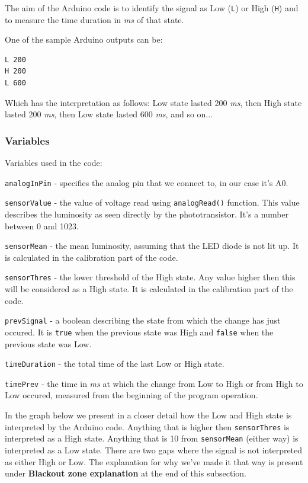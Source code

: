 \documentclass[12pt]{report}
\begin{document}
The aim of the Arduino code is to identify the signal as Low (\verb|L|) or High (\verb|H|) and to measure the time duration in \textit{ms} of that state.

One of the sample Arduino outputs can be:

\begin{snugshade}
\begin{verbatim}
L 200
H 200
L 600
\end{verbatim}
\end{snugshade}

Which has the interpretation as follows: Low state lasted 200 \textit{ms}, then High state lasted 200 \textit{ms}, then Low state lasted 600 \textit{ms}, and so on...




\subsubsection{Variables}

Variables used in the code:

\verb|analogInPin| - specifies the analog pin that we connect to, in our case it's A0.

\verb|sensorValue| - the value of voltage read using \verb|analogRead()| function. This value describes the luminosity as seen directly by the phototransistor. It's a number between 0 and 1023.

\verb|sensorMean| - the mean luminosity, assuming that the LED diode is not lit up. It is calculated in the calibration part of the code.

\verb|sensorThres| - the lower threshold of the High state. Any value higher then this will be considered as a High state. It is calculated in the calibration part of the code.

\verb|prevSignal| - a boolean describing the state from which the change has just occured. It is \verb|true| when the previous state was High and \verb|false| when the previous state was Low.

\verb|timeDuration| - the total time of the last Low or High state.

\verb|timePrev| - the time in \textit{ms} at which the change from Low to High or from High to Low occured, measured from the beginning of the program operation.

In the graph below we present in a closer detail how the Low and High state is interpreted by the Arduino code. Anything that is higher then \verb|sensorThres| is interpreted as a High state. Anything that is 10 from \verb|sensorMean| (either way) is interpreted as a Low state. There are two gaps where the signal is not interpreted as either High or Low. The explanation for why we've made it that way is present under \textbf{Blackout zone explanation} at the end of this subsection.
\end{document}
